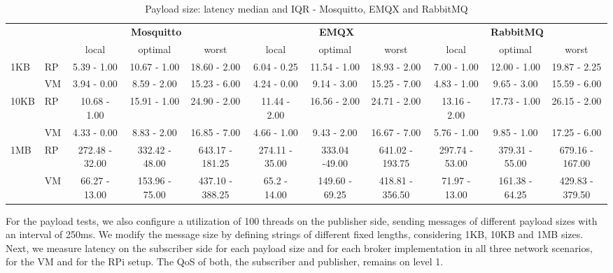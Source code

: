 \documentclass[conference]{IEEEtran}
\begin{document}
\begin{table}[!t]
    \begin{center}
     \setlength\tabcolsep{1.2pt}
     \caption{Payload size: latency median and IQR - Mosquitto, EMQX and RabbitMQ}
     \label{table:rpi_vm_payload}
    \begin{tabular}{llccccccccc }
        \toprule
   
     &  & \multicolumn{3}{c}{\textbf{Mosquitto}} & \multicolumn{3}{c}{\textbf{EMQX}} & \multicolumn{3}{c}{\textbf{RabbitMQ}}\\[0.5ex] 
     &  & local    & optimal   & worst   & local  & optimal & worst & local   & optimal   & worst   \\ 
     \midrule 
     \multirow{2}{*}{1KB}   & RP  & 5.39 - 1.00 & 10.67 - 1.00 & 18.60 - 2.00& 6.04 - 0.25 &
     11.54 - 1.00 & 18.93 - 2.00 & 7.00 - 1.00 & 12.00 - 1.00  & 19.87 - 2.25 \\ [0.5ex] 
       & VM & 3.94 - 0.00 & 8.59 - 2.00  & 15.23 - 6.00 & 4.24 - 0.00 &  9.14 - 3.00 & 15.25 -
       7.00  & 4.83 - 1.00 & 9.65 - 3.00 & 15.59 - 6.00   \\ [0.5ex] \hline
                                   
\multirow{2}{*}{10KB} & RP & 10.68 - 1.00  & 15.91 - 1.00  & 24.90 - 2.00  & 11.44 - 2.00 & 16.56
- 2.00 & 24.71 - 2.00 & 13.16 - 2.00 & 17.73 - 1.00  & 26.15 - 2.00 \\ [0.5ex] 
   & VM & 4.33 - 0.00 & 8.83 - 2.00  & 16.85 - 7.00  & 4.66 - 1.00 & 9.43 - 2.00  & 16.67 - 7.00
   &  5.76 - 1.00 & 9.85 - 1.00 & 17.25 - 6.00   \\ [0.5ex]  \hline  

\multirow{2}{*}{1MB}   & RP & 272.48 - 32.00  & 332.42 - 48.00  & 643.17 - 181.25 & 274.11 - 35.00&
333.04 -49.00 & 641.02 - 193.75  & 297.74 - 53.00 & 379.31 - 55.00 & 679.16 - 167.00 \\ [0.5ex] 
    & VM & 66.27 - 13.00 & 153.96 - 75.00 & 437.10 - 388.25 & 65.2 - 14.00  & 149.60 - 69.25  &
    418.81 - 356.50 & 71.97 - 13.00 & 161.38 - 64.25 & 429.83 - 379.50  \\ [0.5ex] \hline
    \end{tabular}
\end{center}

\label{table:results_123}
    \end{table}


    For the payload tests, we also configure a utilization of 100 threads on the publisher side, sending messages of different payload sizes with an interval of 250ms. We modify the message size by defining strings of different fixed lengths, considering 1KB, 10KB and 1MB sizes. Next, we measure latency on the subscriber side for each payload size and for each broker implementation in all three network scenarios, for the VM and for the RPi setup. The QoS of both, the subscriber and publisher, remains on level 1. 
\end{document}
